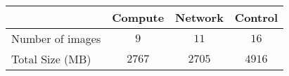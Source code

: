 
\begin{tabular}{lccc}
   \toprule
   & Compute & Network & Control\\
   \midrule
   Number of images & $9$ & $11$ & $16$\\
   Total Size (MB) & $2767$ & $2705$ & $4916$\\
   \bottomrule
\end{tabular}

